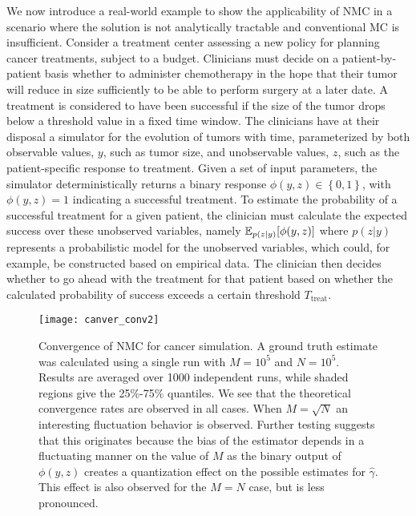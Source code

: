 We now introduce a real-world example to show the applicability of NMC in a scenario
where the solution is not analytically tractable and conventional MC is insufficient.
Consider a treatment center assessing a new policy for planning cancer treatments, subject to a budget. 
Clinicians must decide on a patient-by-patient basis whether to administer chemotherapy in the
hope that their tumor will reduce in size sufficiently to be able to perform surgery at a later date.
A treatment is considered to have been successful if the size of the tumor drops below a threshold value in a fixed time window.
The clinicians have at their disposal a simulator for the evolution of tumors with time,
parameterized by both observable values, $y$, such as tumor size, and unobservable values, $z$, such as the patient-specific response to treatment.
Given a set of input parameters, the simulator deterministically returns a binary response $\phi(y,z)\in\left\lbrace 0,1\right\rbrace $, with $\phi(y,z) = 1$ indicating a successful treatment.
To estimate the probability of a successful treatment for a given patient, the clinician must calculate the expected
success over these unobserved variables, namely $\mathbb{E}_{p(z|y)} [\phi(y,z)]$ where $p(z|y)$ represents a probabilistic
model for the unobserved variables, which could, for example, be constructed based on empirical data.
The clinician then decides whether to go ahead with the treatment for that
patient based on whether the calculated probability of success exceeds a certain threshold $T_{\mathrm{treat}}$.

\begin{figure}[t]
	\centering
		\texttt{[image: canver\_conv2]}
	\caption{Convergence of NMC for cancer simulation.
		A ground truth estimate was calculated
		using a single run with $M=10^5$ and $N=10^5$.
		Results are averaged over 1000 independent runs, while shaded regions give the 25\%-75\% quantiles. We
		see that the theoretical convergence rates are observed in all cases.
		When $M=\sqrt{N}$ an interesting fluctuation behavior is observed.  
		Further testing suggests that this originates because the bias of the estimator depends in
		a fluctuating manner on the value of $M$ as the binary output of $\phi(y,z)$ creates a quantization
		effect on the possible estimates for $\hat{\gamma}$.  This effect is also observed for the $M=N$ case,
		but is less pronounced. \label{fig:emperical-conv-cancer} \vspace{-5pt}}
\end{figure}


